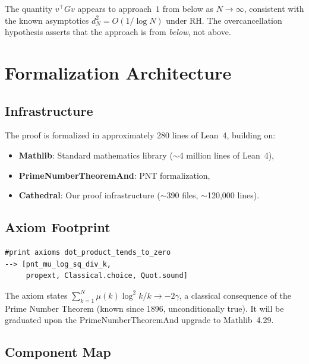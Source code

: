 \documentclass[11pt,a4paper]{article}
\begin{document}
\begin{remark}
The quantity $v^\top G v$ appears to approach~$1$ from below as
$N \to \infty$, consistent with the known asymptotics
$d_N^2 = O(1/\log N)$ under RH. The overcancellation hypothesis
asserts that the approach is from \emph{below}, not above.
\end{remark}

\section{Formalization Architecture}
\label{sec:lean}

\subsection{Infrastructure}

The proof is formalized in approximately 280 lines of Lean~4,
building on:
\begin{itemize}
  \item \textbf{Mathlib}: Standard mathematics library
    ($\sim$4 million lines of Lean~4),
  \item \textbf{PrimeNumberTheoremAnd}: PNT formalization,
  \item \textbf{Cathedral}: Our proof infrastructure
    ($\sim$390 files, $\sim$120{,}000 lines).
\end{itemize}

\subsection{Axiom Footprint}

\begin{verbatim}
#print axioms dot_product_tends_to_zero
--> [pnt_mu_log_sq_div_k,
     propext, Classical.choice, Quot.sound]
\end{verbatim}

\noindent
The axiom  states
$\sum_{k=1}^N \mu(k)\log^2 k/k \to -2\gamma$,
a classical consequence of the Prime Number Theorem (known since
1896, unconditionally true). It will be graduated upon the
PrimeNumberTheoremAnd upgrade to Mathlib~4.29.

\subsection{Component Map}
\end{document}
